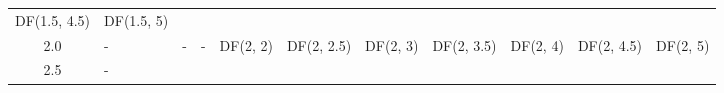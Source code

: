 \documentclass{article}
\begin{document}
\begin{longtable}[c]{@{}cllllllllll@{}}
\begin{minipage}[t]{0.15\columnwidth}\raggedright\strut
DF(1.5, 4.5)
\strut\end{minipage} &
\begin{minipage}[t]{0.13\columnwidth}\raggedright\strut
DF(1.5, 5)
\strut\end{minipage}\tabularnewline
\begin{minipage}[t]{0.08\columnwidth}\centering\strut
2.0
\strut\end{minipage} &
\begin{minipage}[t]{0.15\columnwidth}\raggedright\strut
-
\strut\end{minipage} &
\begin{minipage}[t]{0.13\columnwidth}\raggedright\strut
-
\strut\end{minipage} &
\begin{minipage}[t]{0.15\columnwidth}\raggedright\strut
-
\strut\end{minipage} &
\begin{minipage}[t]{0.13\columnwidth}\raggedright\strut
DF(2, 2)
\strut\end{minipage} &
\begin{minipage}[t]{0.15\columnwidth}\raggedright\strut
DF(2, 2.5)
\strut\end{minipage} &
\begin{minipage}[t]{0.13\columnwidth}\raggedright\strut
DF(2, 3)
\strut\end{minipage} &
\begin{minipage}[t]{0.15\columnwidth}\raggedright\strut
DF(2, 3.5)
\strut\end{minipage} &
\begin{minipage}[t]{0.13\columnwidth}\raggedright\strut
DF(2, 4)
\strut\end{minipage} &
\begin{minipage}[t]{0.15\columnwidth}\raggedright\strut
DF(2, 4.5)
\strut\end{minipage} &
\begin{minipage}[t]{0.13\columnwidth}\raggedright\strut
DF(2, 5)
\strut\end{minipage}\tabularnewline
\begin{minipage}[t]{0.08\columnwidth}\centering\strut
2.5
\strut\end{minipage} &
\begin{minipage}[t]{0.15\columnwidth}\raggedright\strut
-
\strut\end{minipage} &
\begin{minipage}[t]{0.13\columnwidth}\raggedright\strut

\end{minipage}
\end{longtable}
\end{document}
